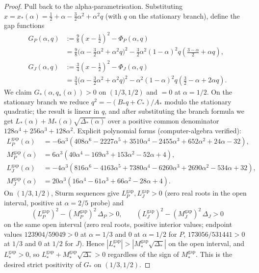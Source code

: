 \documentclass[11pt]{amsart}
\theoremstyle{definition}
\begin{document}
\begin{proof}
Pull back to the alpha-parametrisation.  Substituting
$x = x_*(\alpha) = \tfrac12+\alpha-\tfrac32\alpha^2+\alpha^2 q$ (with $q$ on the
stationary branch), define the gap functions
\begin{align*}
G_P(\alpha,q) &:= \tfrac98 (x-\tfrac12)^2 - \Phi_P(\alpha, q) \\
              &= \tfrac98 \bigl(\alpha-\tfrac32\alpha^2+\alpha^2 q\bigr)^2
                 - \tfrac32\alpha^2(1-\alpha)^2 q\!\left(\tfrac{3-\alpha}{2}+\alpha q\right),
\\
G_J(\alpha,q) &:= \tfrac34 (x-\tfrac12)^2 - \Phi_J(\alpha, q) \\
              &= \tfrac34 \bigl(\alpha-\tfrac32\alpha^2+\alpha^2 q\bigr)^2
                 - \alpha^2(1-\alpha)^2 q\!\left(\tfrac32-\alpha+2\alpha q\right).
\end{align*}
We claim $G_*(\alpha, q_*(\alpha))>0$ on $(1/3,1/2)$ and $=0$ at $\alpha=1/2$.
On the stationary branch we reduce $q^2 = -(B_*q+C_*)/A_*$ modulo the
stationary quadratic; the result is linear in $q$, and after substituting the
branch formula we get $L_*(\alpha) + M_*(\alpha)\sqrt{\Delta_*(\alpha)}$ over
a positive common denominator $128\alpha^4+256\alpha^3+128\alpha^2$.
Explicit polynomial forms (computer-algebra verified):
\begin{align*}
L_P^{\mathrm{gap}}(\alpha) &= -6\alpha^3(408\alpha^6 - 2227\alpha^5 + 3510\alpha^4 - 2455\alpha^3 + 652\alpha^2 + 24\alpha - 32),
\\
M_P^{\mathrm{gap}}(\alpha) &= 6\alpha^3(40\alpha^4 - 169\alpha^3 + 153\alpha^2 - 52\alpha + 4),
\\
L_J^{\mathrm{gap}}(\alpha) &= -4\alpha^3(816\alpha^6 - 4163\alpha^5 + 7380\alpha^4 - 6260\alpha^3 + 2690\alpha^2 - 534\alpha + 32),
\\
M_J^{\mathrm{gap}}(\alpha) &= 20\alpha^3(16\alpha^4 - 61\alpha^3 + 66\alpha^2 - 28\alpha + 4).
\end{align*}
On $(1/3,1/2)$, Sturm sequences give $L_P^{\mathrm{gap}},L_J^{\mathrm{gap}} > 0$
(zero real roots in the open interval, positive at $\alpha=2/5$ probe) and
\[
   (L_P^{\mathrm{gap}})^2 - (M_P^{\mathrm{gap}})^2\,\Delta_P > 0,
   \qquad
   (L_J^{\mathrm{gap}})^2 - (M_J^{\mathrm{gap}})^2\,\Delta_J > 0
\]
on the same open interval (zero real roots, positive interior values; endpoint
values $123904/59049 > 0$ at $\alpha=1/3$ and $0$ at $\alpha=1/2$ for $P$,
$173056/531441 > 0$ at $1/3$ and $0$ at $1/2$ for $J$).
Hence $|L_*^{\mathrm{gap}}| > |M_*^{\mathrm{gap}}\sqrt{\Delta_*}|$ on the
open interval, and $L_*^{\mathrm{gap}} > 0$, so
$L_*^{\mathrm{gap}} + M_*^{\mathrm{gap}}\sqrt{\Delta_*} > 0$ regardless of the
sign of $M_*^{\mathrm{gap}}$.  This is the desired strict positivity of
$G_*$ on $(1/3,1/2)$.


\end{proof}
\end{document}
